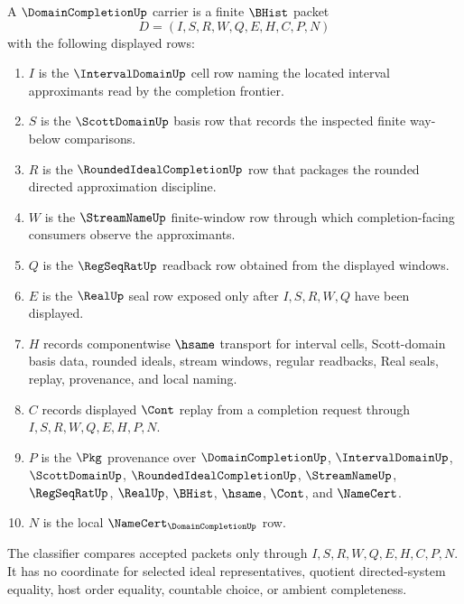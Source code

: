 \begin{definition}
\label{def:domain-completion-carrier}
A $\DomainCompletionUp$ carrier is a finite $\BHist$ packet
$$
D=(I,S,R,W,Q,E,H,C,P,N)
$$
with the following displayed rows:
\begin{enumerate}
\item $I$ is the $\IntervalDomainUp$ cell row naming the located interval approximants read by the completion frontier.
\item $S$ is the $\ScottDomainUp$ basis row that records the inspected finite way-below comparisons.
\item $R$ is the $\RoundedIdealCompletionUp$ row that packages the rounded directed approximation discipline.
\item $W$ is the $\StreamNameUp$ finite-window row through which completion-facing consumers observe the approximants.
\item $Q$ is the $\RegSeqRatUp$ readback row obtained from the displayed windows.
\item $E$ is the $\RealUp$ seal row exposed only after $I,S,R,W,Q$ have been displayed.
\item $H$ records componentwise $\hsame$ transport for interval cells, Scott-domain basis data, rounded ideals, stream windows, regular readbacks, Real seals, replay, provenance, and local naming.
\item $C$ records displayed $\Cont$ replay from a completion request through $I,S,R,W,Q,E,H,P,N$.
\item $P$ is the $\Pkg$ provenance over $\DomainCompletionUp$, $\IntervalDomainUp$, $\ScottDomainUp$, $\RoundedIdealCompletionUp$, $\StreamNameUp$, $\RegSeqRatUp$, $\RealUp$, $\BHist$, $\hsame$, $\Cont$, and $\NameCert$.
\item $N$ is the local $\NameCert_{\DomainCompletionUp}$ row.
\end{enumerate}
The classifier compares accepted packets only through $I,S,R,W,Q,E,H,C,P,N$. It has no coordinate for selected ideal representatives, quotient directed-system equality, host order equality, countable choice, or ambient completeness.
\end{definition}

